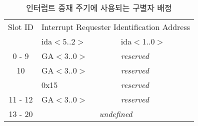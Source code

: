 %
%
\begin{table}[htbp]
\caption{인터럽트 중재 주기에 사용되는 구별자 배정}\label{table:int-ga}
   \begin{center}
   \begin{tabular}{|c|l|l|}
\hline
Slot ID & \multicolumn{2}{|c|}{Interrupt Requester Identification Address} \\ \cline{2-3}
	        & ida$<$5..2$>$ & ida$<$1..0$>$ \\
\hline \hline
	 0 - 9  & GA$<$3..0$>$ & {\it reserved\/} \\ \hline
	10      & GA$<$3..0$>$ & {\it reserved\/} \\
	        & 0x15                 & {\it reserved\/} \\ \hline
	11 - 12 & GA$<$3..0$>$ & {\it reserved\/} \\ \hline
	13 - 20 & \multicolumn{2}{|c|}{{\it undefined\/}} \\
\hline
   \end{tabular}
   \end{center}
\end{table}
%
%
